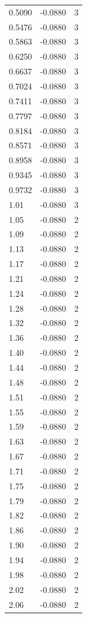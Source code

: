 \begin{longtable}{lrr}
  0.5090 & -0.0880 & 3 \\
  0.5476 & -0.0880 & 3 \\
  0.5863 & -0.0880 & 3 \\
  0.6250 & -0.0880 & 3 \\
  0.6637 & -0.0880 & 3 \\
  0.7024 & -0.0880 & 3 \\
  0.7411 & -0.0880 & 3 \\
  0.7797 & -0.0880 & 3 \\
  0.8184 & -0.0880 & 3 \\
  0.8571 & -0.0880 & 3 \\
  0.8958 & -0.0880 & 3 \\
  0.9345 & -0.0880 & 3 \\
  0.9732 & -0.0880 & 3 \\
  1.01 & -0.0880 & 3 \\
  1.05 & -0.0880 & 2 \\
  1.09 & -0.0880 & 2 \\
  1.13 & -0.0880 & 2 \\
  1.17 & -0.0880 & 2 \\
  1.21 & -0.0880 & 2 \\
  1.24 & -0.0880 & 2 \\
  1.28 & -0.0880 & 2 \\
  1.32 & -0.0880 & 2 \\
  1.36 & -0.0880 & 2 \\
  1.40 & -0.0880 & 2 \\
  1.44 & -0.0880 & 2 \\
  1.48 & -0.0880 & 2 \\
  1.51 & -0.0880 & 2 \\
  1.55 & -0.0880 & 2 \\
  1.59 & -0.0880 & 2 \\
  1.63 & -0.0880 & 2 \\
  1.67 & -0.0880 & 2 \\
  1.71 & -0.0880 & 2 \\
  1.75 & -0.0880 & 2 \\
  1.79 & -0.0880 & 2 \\
  1.82 & -0.0880 & 2 \\
  1.86 & -0.0880 & 2 \\
  1.90 & -0.0880 & 2 \\
  1.94 & -0.0880 & 2 \\
  1.98 & -0.0880 & 2 \\
  2.02 & -0.0880 & 2 \\
  2.06 & -0.0880 & 2 \\

\end{longtable}
